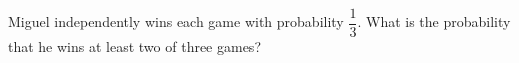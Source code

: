 Miguel independently wins each game with probability $\dfrac{1}{3}$. What is the probability that he wins at least two of three games?
